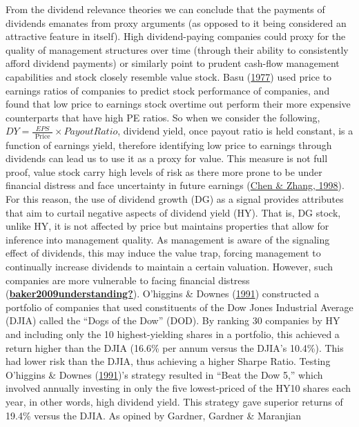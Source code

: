 \documentclass[11pt,preprint, authoryear]{elsarticle}
\numberwithin{equation}{section}
\numberwithin{figure}{section}
\numberwithin{table}{section}
\begin{document}
From the dividend relevance theories we can conclude that the payments
of dividends emanates from proxy arguments (as opposed to it being
considered an attractive feature in itself). High dividend-paying
companies could proxy for the quality of management structures over time
(through their ability to consistently afford dividend payments) or
similarly point to prudent cash-flow management capabilities and stock
closely resemble value stock. Basu
(\protect\hyperlink{ref-basu1977investment}{1977}) used price to
earnings ratios of companies to predict stock performance of companies,
and found that low price to earnings stock overtime out perform their
more expensive counterparts that have high PE ratios. So when we
consider the following,
\(D Y=\frac{E P S}{\text { Price }} \times Payout Ratio\), dividend
yield, once payout ratio is held constant, is a function of earnings
yield, therefore identifying low price to earnings through dividends can
lead us to use it as a proxy for value. This measure is not full proof,
value stock carry high levels of risk as there more prone to be under
financial distress and face uncertainty in future earnings
(\protect\hyperlink{ref-chen1998risk}{Chen \& Zhang, 1998}). For this
reason, the use of dividend growth (DG) as a signal provides attributes
that aim to curtail negative aspects of dividend yield (HY). That is, DG
stock, unlike HY, it is not affected by price but maintains properties
that allow for inference into management quality. As management is aware
of the signaling effect of dividends, this may induce the value trap,
forcing management to continually increase dividends to maintain a
certain valuation. However, such companies are more vulnerable to facing
financial distress
(\protect\hyperlink{ref-baker2009understanding}{\textbf{baker2009understanding?}}).
O'higgins \& Downes (\protect\hyperlink{ref-o1991beating}{1991})
constructed a portfolio of companies that used constituents of the Dow
Jones Industrial Average (DJIA) called the ``Dogs of the Dow'' (DOD). By
ranking 30 companies by HY and including only the 10 highest-yielding
shares in a portfolio, this achieved a return higher than the DJIA
(16.6\% per annum versus the DJIA's 10.4\%). This had lower risk than
the DJIA, thus achieving a higher Sharpe Ratio. Testing O'higgins \&
Downes (\protect\hyperlink{ref-o1991beating}{1991})'s strategy resulted
in ``Beat the Dow 5,'' which involved annually investing in only the
five lowest-priced of the HY10 shares each year, in other words, high
dividend yield. This strategy gave superior returns of 19.4\% versus the
DJIA. As opined by Gardner, Gardner \& Maranjian
\end{document}
